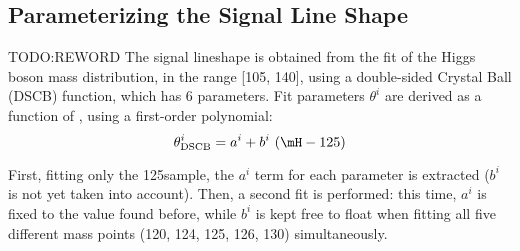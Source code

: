 %

\subsection{Parameterizing the Signal Line Shape}
\label{sec:SignalParametrization}
TODO:REWORD The signal lineshape is obtained from the fit of the Higgs boson mass distribution, 
in the range [105, 140]\GeV, using a double-sided Crystal Ball (DSCB) function, which has 6 parameters.
Fit parameters $\theta^i$ are derived as a function of \mH, using a first-order polynomial:
\[
\theta^{i}_\text{DSCB} = a^i + b^{i}~(\mH - 125)%
\]

First, fitting only the 125\GeV sample, the $a^i$ term for each parameter is extracted ($b^i$ is not yet taken into account).
Then, a second fit is performed:
this time, $a^i$ is fixed to the value found before, while $b^i$ is kept free to float when fitting all five different mass points (120, 124, 125, 126, 130\GeV) simultaneously.

